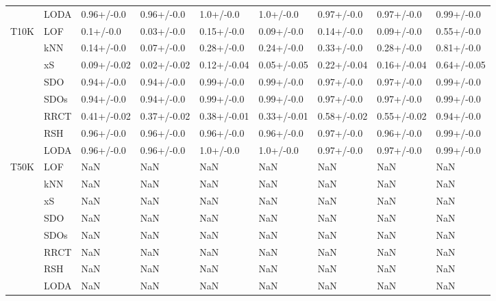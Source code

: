 \begin{table}
\begin{tabular}{lllllllll}
      & LODA &   0.96+/-0.0 &   0.96+/-0.0 &    1.0+/-0.0 &    1.0+/-0.0 &   0.97+/-0.0 &   0.97+/-0.0 &   0.99+/-0.0 \\
T10K & LOF &    0.1+/-0.0 &   0.03+/-0.0 &   0.15+/-0.0 &   0.09+/-0.0 &   0.14+/-0.0 &   0.09+/-0.0 &   0.55+/-0.0 \\
      & kNN &   0.14+/-0.0 &   0.07+/-0.0 &   0.28+/-0.0 &   0.24+/-0.0 &   0.33+/-0.0 &   0.28+/-0.0 &   0.81+/-0.0 \\
      & xS &  0.09+/-0.02 &  0.02+/-0.02 &  0.12+/-0.04 &  0.05+/-0.05 &  0.22+/-0.04 &  0.16+/-0.04 &  0.64+/-0.05 \\
      & SDO &   0.94+/-0.0 &   0.94+/-0.0 &   0.99+/-0.0 &   0.99+/-0.0 &   0.97+/-0.0 &   0.97+/-0.0 &   0.99+/-0.0 \\
      & SDOs &   0.94+/-0.0 &   0.94+/-0.0 &   0.99+/-0.0 &   0.99+/-0.0 &   0.97+/-0.0 &   0.97+/-0.0 &   0.99+/-0.0 \\
      & RRCT &  0.41+/-0.02 &  0.37+/-0.02 &  0.38+/-0.01 &  0.33+/-0.01 &  0.58+/-0.02 &  0.55+/-0.02 &   0.94+/-0.0 \\
      & RSH &   0.96+/-0.0 &   0.96+/-0.0 &   0.96+/-0.0 &   0.96+/-0.0 &   0.97+/-0.0 &   0.96+/-0.0 &   0.99+/-0.0 \\
      & LODA &   0.96+/-0.0 &   0.96+/-0.0 &    1.0+/-0.0 &    1.0+/-0.0 &   0.97+/-0.0 &   0.97+/-0.0 &   0.99+/-0.0 \\
T50K & LOF &          NaN &          NaN &          NaN &          NaN &          NaN &          NaN &          NaN \\
      & kNN &          NaN &          NaN &          NaN &          NaN &          NaN &          NaN &          NaN \\
      & xS &          NaN &          NaN &          NaN &          NaN &          NaN &          NaN &          NaN \\
      & SDO &          NaN &          NaN &          NaN &          NaN &          NaN &          NaN &          NaN \\
      & SDOs &          NaN &          NaN &          NaN &          NaN &          NaN &          NaN &          NaN \\
      & RRCT &          NaN &          NaN &          NaN &          NaN &          NaN &          NaN &          NaN \\
      & RSH &          NaN &          NaN &          NaN &          NaN &          NaN &          NaN &          NaN \\
      & LODA &          NaN &          NaN &          NaN &          NaN &          NaN &          NaN &          NaN \\

\end{tabular}
\end{table}
